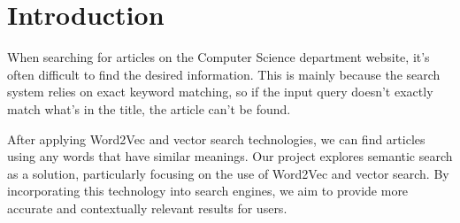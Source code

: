 \section{Introduction}

When searching for articles on the Computer Science department website, it’s often difficult to find the desired information. This is mainly because the search system relies on exact keyword matching, so if the input query doesn’t exactly match what’s in the title, the article can’t be found.

After applying Word2Vec and vector search technologies, we can find articles using any words that have similar meanings. Our project explores semantic search as a solution, particularly focusing on the use of Word2Vec and vector search. By incorporating this technology into search engines, we aim to provide more accurate and contextually relevant results for users.
